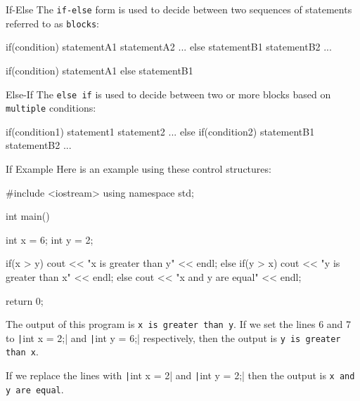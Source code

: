 \documentclass[../lecture3-flowofcontrol.tex]{subfiles}
\begin{document}
\begin{frame}[fragile]{If-Else}
    The \verb|if-else| form is used to decide between two sequences of statements referred to as \verb|blocks|:
\begin{cppcode}[]
if(condition)
{
    statementA1
    statementA2
    ...
}
else
{
    statementB1
    statementB2
    ...
}
\end{cppcode}

\begin{cppcode}[]
if(condition)
    statementA1
else
    statementB1
\end{cppcode}
\end{frame}

\begin{frame}[fragile]{Else-If}
    The \verb|else if| is used to decide between two or more blocks based on \verb|multiple| conditions:
\begin{cppcode}[]
if(condition1)
{
    statement1
    statement2
    ...
}
else if(condition2)
{
    statementB1
    statementB2
    ...
}
\end{cppcode}
\end{frame}

\begin{frame}[fragile]{If Example}
    Here is an example using these control structures:
\begin{cppcode}[]
#include <iostream>
using namespace std;

int main()
{
    int x = 6;
    int y = 2;

    if(x > y)
        cout << "x is greater than y" << endl;
    else if(y > x)
        cout << "y is greater than x" << endl;
    else
        cout << "x and y are equal" << endl;

    return 0;
}
\end{cppcode}

    The output of this program is \verb|x is greater than y|. If we set the lines 6 and 7 to \texttt|int x = 2;| and \texttt|int y = 6;| respectively, then the output is \verb|y is greater than x|. \newline

    If we replace the lines with \texttt|int x = 2| and \texttt|int y = 2;| then the output is \verb|x and y are equal|.
\end{frame}

\end{document}
